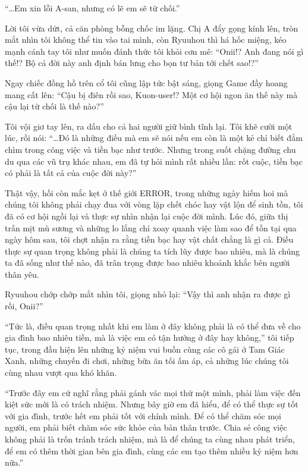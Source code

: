 \documentclass[../main.tex]{subfiles}
\begin{document}
``\dots Em xin lỗi A-san, nhưng có lẽ em sẽ từ chối.''

Lời tôi vừa dứt, cả căn phòng bỗng chốc im lặng. Chị A đẩy gọng kính lên, tròn mắt nhìn tôi không thể tin vào tai mình, còn Ryuuhou thì há hốc miệng, kéo mạnh cánh tay tôi như muốn đánh thức tôi khỏi cơn mê: ``Onii!? Anh đang nói gì thế!? Bộ cả đời này anh định bán lưng cho bọn tư bản tới chết sao!?''

Ngay chiếc đồng hồ trên cổ tôi cũng lập tức bật sáng, giọng Game đầy hoang mang cất lên: ``Cậu bị điên rồi sao, Kuon-user!? Một cơ hội ngon ăn thế này mà cậu lại từ chối là thế nào?''

Tôi vội giơ tay lên, ra dấu cho cả hai người giữ bình tĩnh lại. Tôi khẽ cười một lúc, rồi nói: ``\dots Đó là những điều mà em sẽ nói nếu em còn là một kẻ chỉ biết đắm chìm trong công việc và tiền bạc như trước. Nhưng trong suốt chặng đường chu du qua các vũ trụ khác nhau, em đã tự hỏi mình rất nhiều lần: rốt cuộc, tiền bạc có phải là tất cả của cuộc đời này?''

Thật vậy, hồi còn mắc kẹt ở thế giới ERROR, trong những ngày hiếm hoi mà chúng tôi không phải chạy đua với vòng lặp chết chóc hay vật lộn để sinh tồn, tôi đã có cơ hội ngồi lại và thực sự nhìn nhận lại cuộc đời mình. Lúc đó, giữa thị trấn mịt mù sương và những lo lắng chỉ xoay quanh việc làm sao để tồn tại qua ngày hôm sau, tôi chợt nhận ra rằng tiền bạc hay vật chất chẳng là gì cả. Điều thực sự quan trọng không phải là chúng ta tích lũy được bao nhiêu, mà là chúng ta đã sống như thế nào, đã trân trọng được bao nhiêu khoảnh khắc bên người thân yêu.

Ryuuhou chớp chớp mắt nhìn tôi, giọng nhỏ lại: ``Vậy thì anh nhận ra được gì rồi, Onii?''

``Tức là, điều quan trọng nhất khi em làm ở đây không phải là có thể đưa về cho gia đình bao nhiêu tiền, mà là việc em có tận hưởng ở đây hay không,'' tôi tiếp tục, trong đầu hiện lên những kỷ niệm vui buồn cùng các cô gái ở Tam Giác Xanh, những chuyến đi chơi, những bữa ăn tối ấm áp, cả những lúc chúng tôi cùng nhau vượt qua khó khăn.

``Trước đây em cứ nghĩ rằng phải gánh vác mọi thứ một mình, phải làm việc đến kiệt sức mới là có trách nhiệm. Nhưng bây giờ em đã hiểu, để có thể thực sự tốt với gia đình, trước hết em phải tốt với chính mình. Để có thể chăm sóc mọi người, em phải biết chăm sóc sức khỏe của bản thân trước. Chia sẻ công việc không phải là trốn tránh trách nhiệm, mà là để chúng ta cùng nhau phát triển, để em có thêm thời gian bên gia đình, cùng các em tạo thêm nhiều kỷ niệm hơn nữa.''
\end{document}
